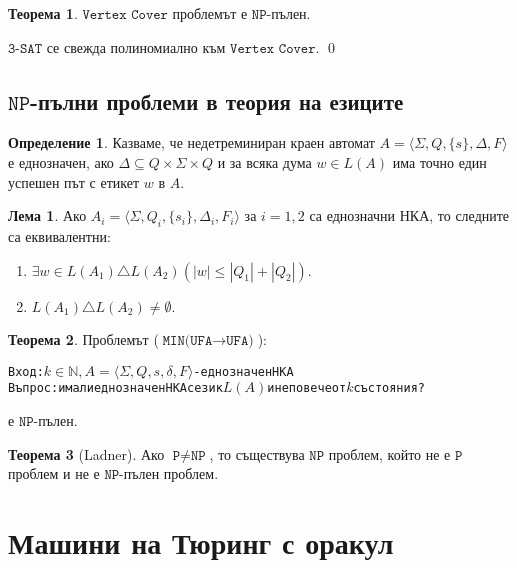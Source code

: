 \documentclass[a4paper]{article}
\theoremstyle{definition}
\newtheorem{theorem}{Теорема}
\newtheorem{lemma}{Лема}
\newtheorem{definition}{Определение}
\newenvironment{hint}{\noindent{\bf Упътване.}\hspace*{1em}}{\qed\par\vspace*{1em}}
\begin{document}
\begin{theorem}
  $\texttt{Vertex Cover}$ проблемът е $\texttt{NP}$-пълен.
\end{theorem}
\begin{hint}
  $\texttt{3-SAT}$ се свежда полиномиално към $\texttt{Vertex Cover}$.
\end{hint}


\subsection*{$\texttt{NP}$-пълни проблеми в теория на езиците}

\begin{definition}
Казваме, че недетреминиран краен автомат $A=\langle \Sigma,Q,\{s\},\Delta,F\rangle$ е еднозначен,
ако $\Delta\subseteq Q\times \Sigma\times Q$ и за всяка дума $w\in L(A)$ има точно един успешен път с етикет $w$ в $A$.
\end{definition}

\begin{lemma}
  Ако $A_i=\langle \Sigma,Q_i,\{s_i\},\Delta_i,F_i\rangle$ за $i=1,2$ са еднозначни НКА, то следните са еквивалентни:
  \begin{enumerate}
  \item $\exists w\in L(A_1)\triangle L(A_2) (|w|\le |Q_1|+|Q_2|)$.
  \item $L(A_1)\triangle L(A_2)\neq\emptyset$.
  \end{enumerate} 
\end{lemma}

\begin{theorem}
Проблемът ($\texttt{MIN(UFA}\rightarrow\texttt{UFA)}$):
\begin{alltt}
Вход: \(k\in\mathbb{N}, A=\langle\Sigma,Q,s,\delta,F\rangle\) - еднозначен НКА
Въпрос: има ли еднозначен НКА с език \(L(A)\) и не повече от \(k\) състояния?
\end{alltt}
е $\texttt{NP}$-пълен.
\end{theorem}

\begin{theorem}[Ladner]
  Ако $\texttt{P} \neq \texttt{NP}$, то съществува $\texttt{NP}$ проблем, който не е $\texttt{P}$ проблем и не е $\texttt{NP}$-пълен проблем.
\end{theorem}

\section{Машини на Тюринг с оракул}
\end{document}

